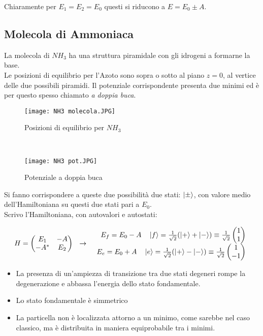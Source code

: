 \documentclass[twoside]{article}
\begin{document}
Chiaramente per $E_1=E_2=E_0$ questi si riducono a $E=E_0 \pm A$.

\vspace{0.5cm}

\subsection{Molecola di Ammoniaca}
La molecola di $NH_3$ ha una struttura piramidale con gli idrogeni a formarne la base.
\\
Le posizioni di equilibrio per l'Azoto sono sopra o sotto al piano $z=0$, al vertice delle due possibili piramidi. Il potenziale corrispondente presenta due minimi ed è per questo spesso chiamato \textit{a doppia buca}.

\begin{figure}[ht]
\begin{minipage}[b]{8.5cm}
\centering
\texttt{[image: NH3 molecola.JPG]}
\caption{Posizioni di equilibrio per $NH_3$}
\end{minipage}
\ \hspace{2mm} \hspace{3mm} \
\begin{minipage}[b]{8.5cm}
\centering
\texttt{[image: NH3 pot.JPG]}
\caption{Potenziale a doppia buca}
\end{minipage}
\end{figure}

Si fanno corrispondere a queste due possibilità due stati: $\ket{\pm}$, con valore medio dell'Hamiltoniana su questi due stati pari a $E_0$.
\\
Scrivo l'Hamiltoniana, con autovalori e autostati:

\begin{equation} 
 H=   \begin{pmatrix} 
   E_1 & -A \\
   -A^* & E_2 
\end{pmatrix} \ \ \rightarrow \ \ 
\begin{array}{rl}
            E_f =E_0 -A \ \ \ \ket{f}=\frac{1}{\sqrt{2}}(\ket{+}+\ket{-})\equiv\frac{1}{\sqrt{2}} \begin{pmatrix} 
   1 \\
   1 
\end{pmatrix} \\
         E_e =E_0 +A \ \ \ \ket{e}=\frac{1}{\sqrt{2}}(\ket{+}-\ket{-})\equiv\frac{1}{\sqrt{2}}\begin{pmatrix} 
   1 \\
   -1 
\end{pmatrix}
        \end{array}
\end{equation}
\begin{itemize}
    \item La presenza di un'ampiezza di transizione tra due stati degeneri rompe la degenerazione e abbassa l'energia dello stato fondamentale.
    \item Lo stato fondamentale è simmetrico
    \item La particella non è localizzata attorno a un minimo, come sarebbe nel caso classico, ma è distribuita in maniera equiprobabile tra i minimi.
\end{itemize}
\end{document}
